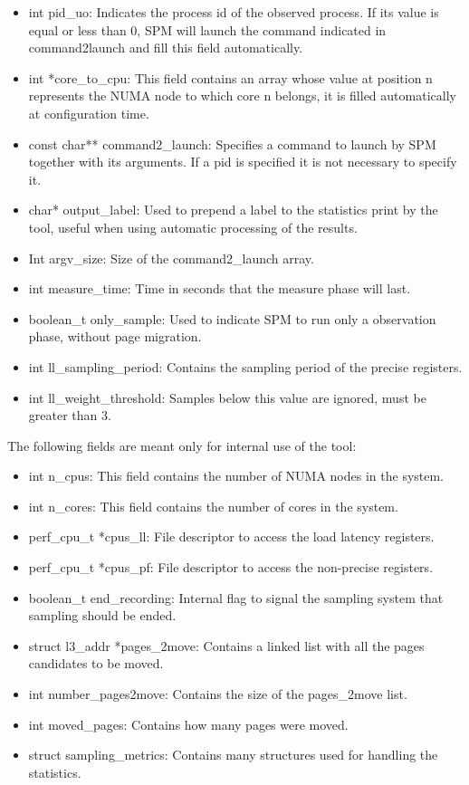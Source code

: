 \begin{itemize}
\item int pid\_uo: Indicates the process id of the observed process. If its value is equal or less than 0, SPM will launch the command indicated in command2launch and fill this field automatically.
\item int *core\_to\_cpu: This field contains an array whose value at position n represents the NUMA node to which core n belongs, it is filled automatically at configuration time.
\item const char** command2\_launch: Specifies a command to launch by SPM together with its arguments. If a pid is specified it is not necessary to specify it.
\item char* output\_label: Used to prepend a label to the statistics print by the tool, useful when using automatic processing of the results.
\item Int argv\_size: Size of the command2\_launch array.
\item int measure\_time: Time in seconds that the measure phase will last.
\item boolean\_t only\_sample: Used to indicate SPM to run only a observation phase, without page migration.
\item int ll\_sampling\_period: Contains the sampling period of the precise registers.
\item int ll\_weight\_threshold: Samples below this value are ignored, must be greater than 3.
\end{itemize}
The following fields are meant only for internal use of the tool:
\begin{itemize}
	\item int n\_cpus: This field contains the number of NUMA nodes in the system.
\item int n\_cores: This field contains the number of cores in the system.
\item perf\_cpu\_t *cpus\_ll: File descriptor to access the load latency registers.
\item perf\_cpu\_t *cpus\_pf: File descriptor to access the non-precise registers.
\item boolean\_t end\_recording: Internal flag to signal the sampling system that sampling should be ended.
\item struct l3\_addr *pages\_2move: Contains a linked list with all the pages candidates to be moved.
\item int number\_pages2move: Contains the size of the pages\_2move list.
\item int moved\_pages: Contains how many pages were moved.
\item struct sampling\_metrics: Contains many structures used for handling the statistics.
\end{itemize}
